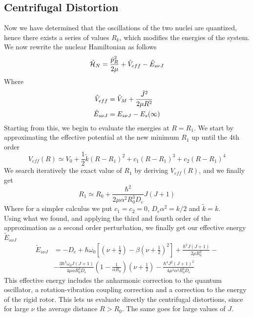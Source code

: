 \documentclass[../qm.tex]{subfiles}
\begin{document}
	\subsection{Centrifugal Distortion}
	Now we have determined that the oscillations of the two nuclei are quantized, hence there exists a series of values $R_k$, which modifies the energies of the system. We now rewrite the nuclear Hamiltonian as follows
	\begin{equation}
		\hat{\mathcal{H}}_N=\frac{\hat{p}_R^2}{2\mu}+\hat{V}_{eff}-\tilde{E}_{s\nu J}
		\label{eq:newnuclearhambo}
	\end{equation}
	Where
	\begin{equation*}
		\begin{aligned}
			\hat{V}_{eff}&=\hat{V}_M+\frac{\hat{J}^2}{2\mu R^2}\\
			\tilde{E}_{s\nu J}&=E_{s\nu J}-E_s(\infty)
		\end{aligned}
	\end{equation*}
	Starting from this, we begin to evaluate the energies at $R=R_1$. We start by approximating the effective potential at the new minimum $R_1$ up until the 4th order
	\begin{equation*}
		V_{eff}(R)\simeq V_0+\frac{1}{2}\tilde{k}(R-R_1)^2+c_1(R-R_1)^3+c_2(R-R_1)^4
	\end{equation*}
	We search iteratively the exact value of $R_1$ by deriving $V_{eff}(R)$, and we finally get
	\begin{equation}
		R_1\simeq R_0+\frac{\hbar^2}{2\mu\alpha^2R_0^3D_e}J(J+1)
		\label{eq:R1bornopp}
	\end{equation}
	Where for a simpler calculus we put $c_1=c_2=0$, $D_e\alpha^2=k/2$ and $\tilde{k}=k$.\\
	Using what we found, and applying the third and fourth order of the approximation as a second order perturbation, we finally get our effective energy $\tilde{E}_{s\nu J}$
	\begin{equation}
		\begin{aligned}
			\tilde{E}_{s\nu J}&=-D_e+\hbar\omega_0\left[ \left( \nu+\frac{1}{2} \right)-\beta\left( \nu+\frac{1}{2} \right)^2 \right]+\frac{\hbar^2J(J+1)}{2\mu R_0^2}-\\
			&-\frac{3\hbar^3\omega_0J(J+1)}{4\mu\alpha R_0^3D_e}\left( 1-\frac{1}{\alpha R_0} \right)\left( \nu+\frac{1}{2} \right)-\frac{\hbar^4J^2(J+1)^2}{4\mu^2\alpha^2R_0^6D_e}
		\end{aligned}
		\label{eq:effectiveenergybornopp}
	\end{equation}
	This effective energy includes the anharmonic correction to the quantum oscillator, a rotation-vibration coupling correction and a correction to the energy of the rigid rotor. This lets us evaluate directly the centrifugal distortions, since for large $\nu$ the average distance $R>R_0$. The same goes for large values of $J$.
\end{document}
